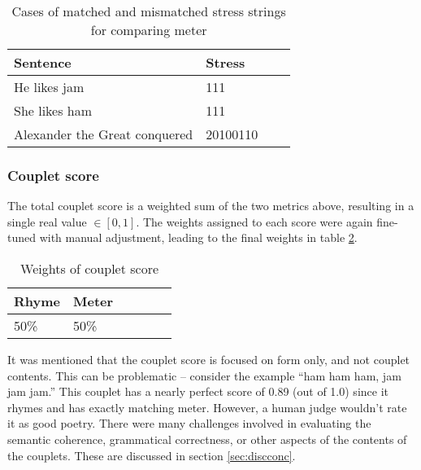 \documentclass[11pt,a4paper]{article}
\begin{document}
\begin{table}
\centering
\begin{tabular}{ll c c}
	\hline\hline
	Sentence & Stress \\ [0.5ex]
	\hline\hline
	He likes jam & 111 \\ [0.5ex]
	\hline
	She likes ham & 111 \\ [0.5ex]
	\hline
	Alexander the Great conquered & 20100110 \\ [0.5ex]
	\hline
\end{tabular}
\caption{Cases of matched and mismatched stress strings for comparing meter}
\label{table:stress}
\end{table}

\subsubsection{Couplet score}
\label{sec:coupletscore}

The total couplet score is a weighted sum of the two metrics above, resulting in a single real value $\in [0, 1]$. The weights assigned to each score were again fine-tuned with manual adjustment, leading to the final weights in table \ref{table:weight_couplet_score}.

\begin{table}[ht]
\centering
\begin{tabular}{lll c c c}
	\hline\hline
	Rhyme & Meter \\ [0.5ex]
	\hline\hline
	50\% & 50\% \\ [0.5ex]
	\hline
\end{tabular}
\caption{Weights of couplet score}
\label{table:weight_couplet_score}
\end{table}

It was mentioned that the couplet score is focused on form only, and not couplet contents. This can be problematic -- consider the example ``ham ham ham, jam jam jam.'' This couplet has a nearly perfect score of 0.89 (out of 1.0) since it rhymes and has exactly matching meter. However, a human judge wouldn't rate it as good poetry. There were many challenges involved in evaluating the semantic coherence, grammatical correctness, or other aspects of the contents of the couplets. These are discussed in section \ref{sec:discconc}.
\end{document}
